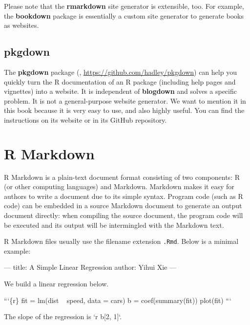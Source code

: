 \documentclass[12pt,]{krantz}
\makeatletter
\newenvironment{Shaded}{\begin{snugshade}}{\end{snugshade}}
\newcommand{\BaseNTok}[1]{\textcolor[rgb]{0.00,0.00,0.81}{#1}}
\newcommand{\NormalTok}[1]{#1}
\newenvironment{kframe}{%
\medskip{}
\setlength{\fboxsep}{.8em}
 \def\at@end@of@kframe{}%
 \ifinner\ifhmode%
  \def\at@end@of@kframe{\end{minipage}}%
  \begin{minipage}{\columnwidth}%
 \fi\fi%
 \def\FrameCommand##1{\hskip\@totalleftmargin \hskip-\fboxsep
 \colorbox{shadecolor}{##1}\hskip-\fboxsep
     \hskip-\linewidth \hskip-\@totalleftmargin \hskip\columnwidth}%
 \MakeFramed {\advance\hsize-\width
   \@totalleftmargin\z@ \linewidth\hsize
   \@setminipage}}%
 {\par\unskip\endMakeFramed%
 \at@end@of@kframe}
\renewenvironment{Shaded}{\begin{kframe}}{\end{kframe}}
\theoremstyle{definition}
\theoremstyle{definition}
\theoremstyle{definition}
\theoremstyle{remark}
\makeatother
\begin{document}
Please note that the \textbf{rmarkdown} site generator is extensible,
too. For example, the \textbf{bookdown} package \citep{R-bookdown} is
essentially a custom site generator to generate books as websites.

\section{pkgdown}\label{pkgdown}

The \textbf{pkgdown} package (\citet{R-pkgdown},
\url{https://github.com/hadley/pkgdown}) can help you quickly turn the R
documentation of an R package (including help pages and vignettes) into
a website. It is independent of \textbf{blogdown} and solves a specific
problem. It is not a general-purpose website generator. We want to
mention it in this book because it is very easy to use, and also highly
useful. You can find the instructions on its website or in its GitHub
repository.

\cleardoublepage 

\appendix {}


\chapter{R Markdown}\label{r-markdown}

R Markdown \citep{R-rmarkdown} is a plain-text
document format consisting of two components: R (or other computing
languages) and Markdown. Markdown makes it easy for authors to write a
document due to its simple syntax. Program code (such as R code) can be
embedded in a source Markdown document to generate an output document
directly: when compiling the source document, the program code will be
executed and its output will be intermingled with the Markdown text.

R Markdown files usually use the filename extension \texttt{.Rmd}. Below
is a minimal example:

\begin{Shaded}
\begin{Highlighting}[]
\NormalTok{---}
\NormalTok{title: A Simple Linear Regression}
\NormalTok{author: Yihui Xie}
\NormalTok{---}

\NormalTok{We build a linear regression below.}

\NormalTok{```\{r\}}
\NormalTok{fit = lm(dist ~ speed, data = cars)}
\NormalTok{b = coef(summary(fit))}
\NormalTok{plot(fit)}
\NormalTok{```}

\NormalTok{The slope of the regression is }\BaseNTok{`r b[2, 1]`}\NormalTok{.}
\end{Highlighting}
\end{Shaded}
\end{document}
